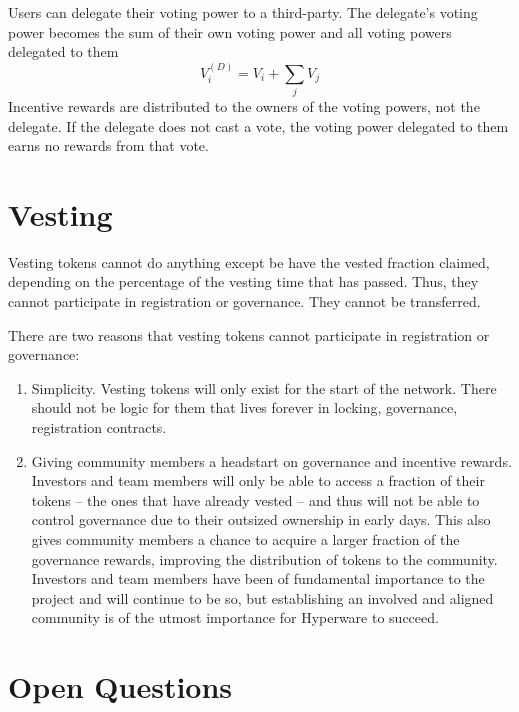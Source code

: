 \documentclass{article}
\begin{document}
Users can delegate their voting power to a third-party.
The delegate's voting power becomes the sum of their own voting power and all voting powers delegated to them
\begin{equation}
V^{(D)}_i = V_i + \sum_j V_j
\end{equation}
Incentive rewards are distributed to the owners of the voting powers, not the delegate.
If the delegate does not cast a vote, the voting power delegated to them earns no rewards from that vote.

\section{Vesting}\label{sec:vesting}

Vesting tokens cannot do anything except be have the vested fraction claimed, depending on the percentage of the vesting time that has passed.
Thus, they cannot participate in registration or governance.
They cannot be transferred.

There are two reasons that vesting tokens cannot participate in registration or governance:
\begin{enumerate}
    \item Simplicity.
         Vesting tokens will only exist for the start of the network.
         There should not be logic for them that lives forever in locking, governance, registration contracts.
    \item Giving community members a headstart on governance and incentive rewards.
         Investors and team members will only be able to access a fraction of their tokens -- the ones that have already vested -- and thus will not be able to control governance due to their outsized ownership in early days.
         This also gives community members a chance to acquire a larger fraction of the governance rewards, improving the distribution of tokens to the community.
         Investors and team members have been of fundamental importance to the project and will continue to be so, but establishing an involved and aligned community is of the utmost importance for Hyperware to succeed.
\end{enumerate}

\section{Open Questions}\label{sec:questions}
\end{document}
